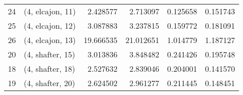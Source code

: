 \begin{tabular}{llrrrr}
24 &  (4, elcajon, 11) &   2.428577 &   2.713097 &   0.125658 &  0.151743 \\
25 &  (4, elcajon, 12) &   3.087883 &   3.237815 &   0.159772 &  0.181091 \\
26 &  (4, elcajon, 13) &  19.666535 &  21.012651 &   1.014779 &  1.187127 \\
20 &  (4, shafter, 15) &   3.013836 &   3.848482 &   0.241426 &  0.195748 \\
18 &  (4, shafter, 18) &   2.527632 &   2.839046 &   0.204001 &  0.141570 \\
19 &  (4, shafter, 20) &   2.624502 &   2.961277 &   0.211445 &  0.148451 \\
\bottomrule
\end{tabular}
